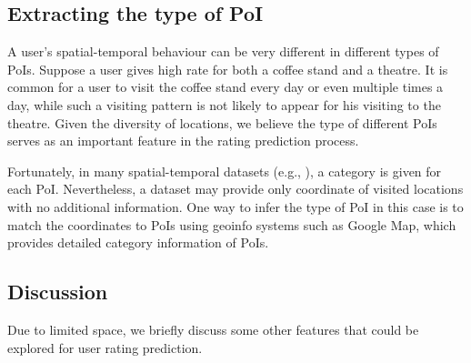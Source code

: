 \subsection{Extracting the type of PoI}

A user's spatial-temporal behaviour can be very different in different types of PoIs. Suppose a user gives high rate for both a coffee stand and a theatre. It is common for a user to visit the coffee stand every day or even multiple times a day, while such a visiting pattern is not likely to appear for his visiting to the theatre. Given the diversity of locations, we believe the type of different PoIs serves as an important feature in the rating prediction process.

Fortunately, in many spatial-temporal datasets (e.g., \cite{yang2014modeling}), a category is given for each PoI. Nevertheless, a dataset may provide only coordinate of visited locations with no additional information. One way to infer the type of PoI in this case is to match the coordinates to PoIs using geoinfo systems such as Google Map, which provides detailed category information of PoIs.


\subsection{Discussion}

Due to limited space, we briefly discuss some other features that could be explored for user rating prediction.




